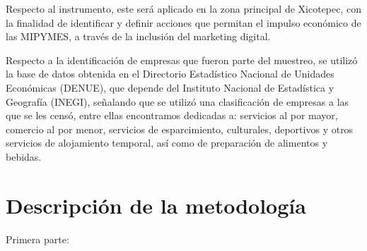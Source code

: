 \documentclass[12pt]{difu100cia} %
\begin{document}
Respecto al instrumento, este será aplicado en la zona principal de Xicotepec, con la finalidad de identificar y definir acciones que permitan el impulso económico de las MIPYMES, a través de la inclusión del marketing digital.

Respecto a la identificación de empresas que fueron parte del muestreo, se utilizó la base de datos obtenida en el Directorio Estadístico Nacional de Unidades Económicas (DENUE), que depende del Instituto Nacional de Estadística y Geografía (INEGI), señalando que se utilizó una clasificación de empresas a las que se les censó, entre ellas encontramos dedicadas a: servicios al por mayor, comercio al por menor, servicios de esparcimiento, culturales, deportivos y otros servicios de alojamiento temporal, así como de preparación de alimentos y bebidas.   
      

\section{Descripción de la metodología}
\label{Descripcion de la metodología}

Primera parte:
\end{document}
